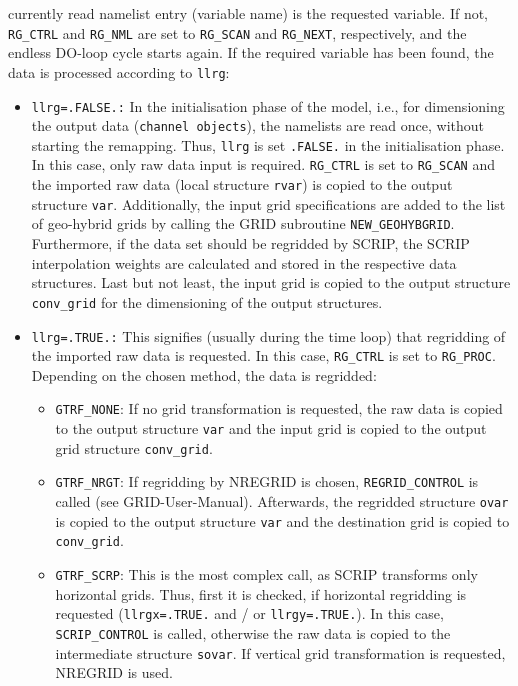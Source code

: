 \documentclass[11pt,twoside]{report}
\begin{document}
currently read namelist entry (variable name) is the requested variable.
If not,  \verb|RG_CTRL| and \verb|RG_NML| are set to \verb|RG_SCAN| and
 \verb|RG_NEXT|, respectively, and the endless DO-loop cycle starts 
again.
If the required variable has been found, the data is processed
according to \verb|llrg|:
\begin{itemize}
\item {\tt llrg=.FALSE.:} In the initialisation phase of the model,
i.e., for dimensioning the output data (\verb|channel objects|),
the namelists are read once, 
without starting the remapping. Thus, \verb|llrg| is set \verb|.FALSE.|
  in the initialisation phase. In this case, only raw data input is required. 
\verb|RG_CTRL| is set to \verb|RG_SCAN| and the imported raw data
(local structure \verb|rvar|) is copied to the output structure \verb|var|.
Additionally, the input grid specifications are added to the list of
 geo-hybrid grids by calling the GRID subroutine \verb|NEW_GEOHYBGRID|. 
Furthermore, if the data set should be regridded by SCRIP, the SCRIP 
interpolation weights are calculated and stored
in the respective data structures. Last but not least, the input grid is copied
to the output structure \verb|conv_grid| for the dimensioning of the
output structures.
\item  {\tt llrg=.TRUE.:} This signifies (usually during the time loop) that
regridding of the imported raw data is requested.  
In this case, \verb|RG_CTRL| is set to \verb|RG_PROC|. 
Depending on the chosen method, the data is regridded:
\begin{itemize}
\item \verb|GTRF_NONE|: If no grid transformation is requested, the
raw data is copied to the output structure \verb|var| and the input
grid is copied to the output grid structure \verb|conv_grid|.
\item \verb|GTRF_NRGT|: If regridding by NREGRID is chosen, 
\verb|REGRID_CONTROL| is called (see GRID-User-Manual). Afterwards, the
regridded structure \verb|ovar| is copied to the output structure \verb|var|
and the destination grid is copied to \verb|conv_grid|.
\item \verb|GTRF_SCRP|: This is the most complex call, as SCRIP
transforms only horizontal grids. Thus, first it is checked, if
horizontal regridding is requested (\verb|llrgx=.TRUE.| and /
or \verb|llrgy=.TRUE.|). In this case, 
\verb|SCRIP_CONTROL| is called, otherwise the raw data
is copied to the intermediate structure \verb|sovar|.
If vertical grid transformation is requested, NREGRID is used.

\end{itemize}
\end{itemize}
\end{document}
